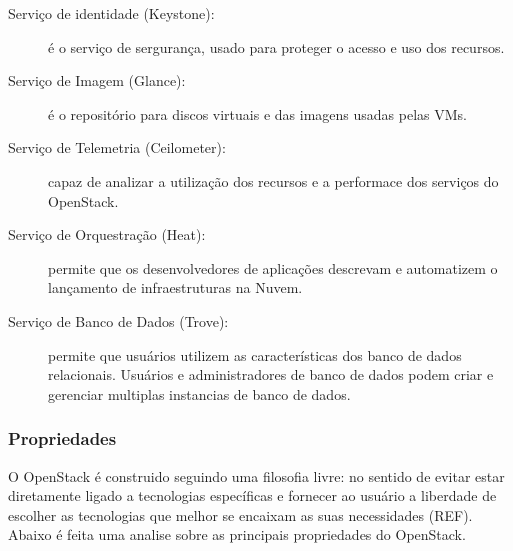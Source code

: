 \begin{description}

	\item[Serviço de identidade (Keystone):] é o serviço de sergurança, usado para proteger o acesso e uso dos recursos.

	\item[Serviço de Imagem (Glance):] é o repositório para discos virtuais e das imagens usadas pelas VMs.

	\item[Serviço de Telemetria (Ceilometer):] capaz de analizar a utilização dos recursos e a performace dos serviços do OpenStack.

	\item[Serviço de Orquestração (Heat):] permite que os desenvolvedores de aplicações descrevam e automatizem o lançamento de infraestruturas na Nuvem.

	\item[Serviço de Banco de Dados (Trove):] permite que usuários utilizem as características dos banco de dados relacionais. Usuários e administradores de banco de dados podem criar e gerenciar multiplas instancias de banco de dados.

\end{description}

\subsubsection{Propriedades}

O OpenStack é construido seguindo uma filosofia livre: no sentido de evitar estar diretamente ligado a tecnologias específicas e fornecer ao usuário a liberdade de escolher as tecnologias que melhor se encaixam as suas necessidades (REF). Abaixo é feita uma analise sobre as principais propriedades do OpenStack.

